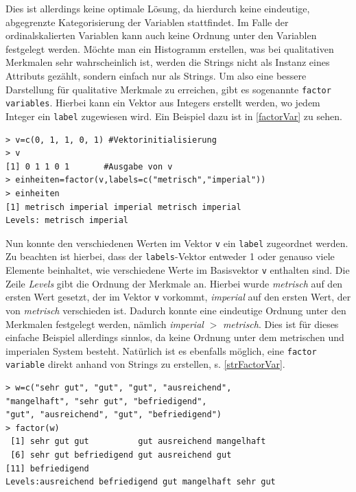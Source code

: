\documentclass[a4paper, 12pt]{report} %
\begin{document}
Dies ist allerdings keine optimale Lösung, da hierdurch keine eindeutige, abgegrenzte Kategorisierung der Variablen stattfindet. Im Falle der ordinalskalierten Variablen kann auch keine Ordnung unter den Variablen festgelegt werden. Möchte man ein Histogramm erstellen, was bei qualitativen Merkmalen sehr wahrscheinlich ist, werden die Strings nicht als Instanz eines Attributs gezählt, sondern einfach nur als Strings. Um also eine bessere Darstellung für qualitative Merkmale zu erreichen, gibt es sogenannte \texttt{factor variables}. Hierbei kann ein Vektor aus Integers erstellt werden, wo jedem Integer ein \texttt{label} zugewiesen wird. Ein Beispiel dazu ist in \ref{factorVar} zu sehen. 

\lstset{language=R}
\begin{lstlisting}[frame=single,caption={Erstellung einer \texttt{factor variable}}]
> v=c(0, 1, 1, 0, 1) #Vektorinitialisierung
> v
[1] 0 1 1 0 1		#Ausgabe von v
> einheiten=factor(v,labels=c("metrisch","imperial"))
> einheiten 
[1] metrisch imperial imperial metrisch imperial
Levels: metrisch imperial
\end{lstlisting}
\label{factorVar}

Nun konnte den verschiedenen Werten im Vektor \texttt{v} ein \texttt{label} zugeordnet werden. Zu beachten ist hierbei, dass der \texttt{labels}-Vektor entweder 1 oder genauso viele Elemente beinhaltet, wie verschiedene Werte im Basisvektor \texttt{v} enthalten sind. Die Zeile \textit{Levels} gibt die Ordnung der Merkmale an. Hierbei wurde \textit{metrisch} auf den ersten Wert gesetzt, der im Vektor \texttt{v} vorkommt, \textit{imperial} auf den ersten Wert, der von \textit{metrisch} verschieden ist. Dadurch konnte eine eindeutige Ordnung unter den Merkmalen festgelegt werden, nämlich \textit{imperial} $>$ \textit{metrisch}. Dies ist für dieses einfache Beispiel allerdings sinnlos, da keine Ordnung unter dem metrischen und imperialen System besteht.  Natürlich ist es ebenfalls möglich, eine \texttt{factor variable} direkt anhand von Strings zu erstellen, s. \ref{strFactorVar}.

\lstset{language=R}
\begin{lstlisting}[frame=single,caption={Erstellung einer \texttt{factor Variable} mit Strings}]
> w=c("sehr gut", "gut", "gut", "ausreichend", 
"mangelhaft", "sehr gut", "befriedigend", 
"gut", "ausreichend", "gut", "befriedigend")
> factor(w)
 [1] sehr gut gut          gut ausreichend mangelhaft  
 [6] sehr gut befriedigend gut ausreichend gut         
[11] befriedigend
Levels:ausreichend befriedigend gut mangelhaft sehr gut
\end{lstlisting}
\label{strFactorVar}
\end{document}
